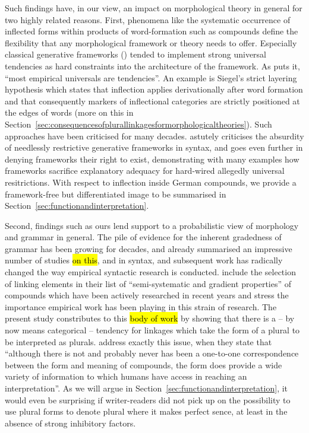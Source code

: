 Such findings have, in our view, an impact on morphological theory in general for two highly related reasons.
First, phenomena like the systematic occurrence of inflected forms within products of word-formation such as compounds define the flexibility that any morphological framework or theory needs to offer.
Especially classical generative frameworks (\egg \citealt{Siegel1979,Mohanan1986,Anderson1992,Pinker1999}) tended to implement strong universal tendencies as hard constraints into the architecture of the framework.
As \textcite[391]{Haspelmath2010} puts it, ``most empirical universals are tendencies''.
An example is Siegel's strict layering hypothesis which states that inflection applies derivationally after word formation and that consequently markers of inflectional categories are strictly positioned at the edges of words (more on this in Section~\ref{sec:consequencesofplurallinkagesformorphologicaltheories}).
Such approaches have been criticised for many decades.
\textcite{Pollard1996} astutely criticises the absurdity of needlessly restrictive generative frameworks in syntax, and \textcite{Haspelmath2010} goes even further in denying frameworks their right to exist, demonstrating with many examples how frameworks sacrifice explanatory adequacy for hard-wired allegedly universal resitrictions.
With respect to inflection inside German compounds, we provide a framework-free but differentiated image to be summarised in Section~\ref{sec:functionandinterpretation}.

Second, findings such as ours lend support to a probabilistic view of morphology and grammar in general.
The pile of evidence for the inherent gradedness of grammar has been growing for decades, and \textcite{HayBaayen2005} already summarised an impressive number of studies \hl{on this}, and in syntax, \textcite{Bresnan2007} and subsequent work has radically changed the way empirical syntactic research is conducted.
\textcite[105]{ArndtlappeEa2016} include the selection of linking elements in their list of ``semi-systematic and gradient properties'' of compounds which have been actively researched in recent years and stress the importance empirical work has been playing in this strain of research.
The present study constributes to this \hl{body of work} by showing that there is a -- by now means categorical -- tendency for linkages which take the form of a plural to be interpreted as plurals.
\textcite[107]{ArndtlappeEa2016} address exactly this issue, when they state that ``although there is not and probably never has been a one-to-one correspondence between the form and meaning of compounds, the form does provide a wide variety of information to which humans have access in reaching an interpretation''.
As we will argue in Section~\ref{sec:functionandinterpretation}, it would even be surprising if writer-readers did not pick up on the possibility to use plural forms to denote plural where it makes perfect sence, at least in the absence of strong inhibitory factors.


